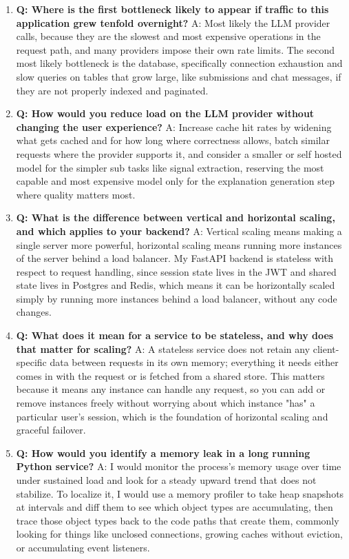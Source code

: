 \documentclass[11pt,a4paper]{report}
\begin{document}
\begin{enumerate}[leftmargin=*]
\item \textbf{Q: Where is the first bottleneck likely to appear if traffic to this application grew tenfold overnight?}
A: Most likely the LLM provider calls, because they are the slowest and most expensive operations in the request path, and many providers impose their own rate limits. The second most likely bottleneck is the database, specifically connection exhaustion and slow queries on tables that grow large, like submissions and chat messages, if they are not properly indexed and paginated.

\item \textbf{Q: How would you reduce load on the LLM provider without changing the user experience?}
A: Increase cache hit rates by widening what gets cached and for how long where correctness allows, batch similar requests where the provider supports it, and consider a smaller or self hosted model for the simpler sub tasks like signal extraction, reserving the most capable and most expensive model only for the explanation generation step where quality matters most.

\item \textbf{Q: What is the difference between vertical and horizontal scaling, and which applies to your backend?}
A: Vertical scaling means making a single server more powerful, horizontal scaling means running more instances of the server behind a load balancer. My FastAPI backend is stateless with respect to request handling, since session state lives in the JWT and shared state lives in Postgres and Redis, which means it can be horizontally scaled simply by running more instances behind a load balancer, without any code changes.

\item \textbf{Q: What does it mean for a service to be stateless, and why does that matter for scaling?}
A: A stateless service does not retain any client-specific data between requests in its own memory; everything it needs either comes in with the request or is fetched from a shared store. This matters because it means any instance can handle any request, so you can add or remove instances freely without worrying about which instance "has" a particular user's session, which is the foundation of horizontal scaling and graceful failover.

\item \textbf{Q: How would you identify a memory leak in a long running Python service?}
A: I would monitor the process's memory usage over time under sustained load and look for a steady upward trend that does not stabilize. To localize it, I would use a memory profiler to take heap snapshots at intervals and diff them to see which object types are accumulating, then trace those object types back to the code paths that create them, commonly looking for things like unclosed connections, growing caches without eviction, or accumulating event listeners.


\end{enumerate}
\end{document}
